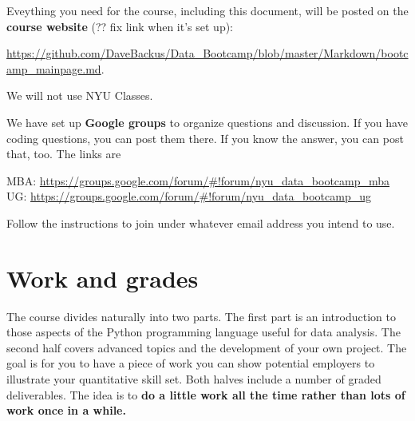 \documentclass[11pt]{article}
\begin{document}
Eveything you need for the course, including this document, will be posted on
the {\bf course website\/} (?? fix link when it's set up):
%
\begin{center}
\url{https://github.com/DaveBackus/Data_Bootcamp/blob/master/Markdown/bootcamp_mainpage.md}.
\end{center}
%
We will not use NYU Classes.  

We have set up {\bf Google groups\/} to organize questions and discussion.
If you have coding questions, you can post them there.  
If you know the answer, you can post that, too.  
The links are
%
\begin{center}
MBA:  \url{https://groups.google.com/forum/#!forum/nyu_data_bootcamp_mba} \\
UG:   \url{https://groups.google.com/forum/#!forum/nyu_data_bootcamp_ug}
\end{center}
%
Follow the instructions to join under whatever email address you intend to use.  




\section*{Work and grades}

The course divides naturally into two parts.
The first part is an introduction to those aspects of the Python programming language
useful for data analysis.  
The second half covers advanced topics and the development of your own project.
The goal is for you to have a piece of work you can show potential employers to 
illustrate your quantitative skill set.
Both halves include a number of graded deliverables.  
The idea is to {\bf do a little work all the time rather than lots of work once in a while.}
\end{document}
